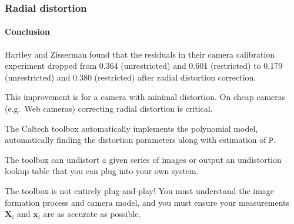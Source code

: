 \documentclass[aspectratio=169]{beamer}
\renewcommand{\vec}[1]{\boldsymbol{#1}}
\newcommand{\mat}[1]{\mathtt{#1}}
\begin{document}
\begin{frame}
\frametitle{Radial distortion}
\framesubtitle{Conclusion}

Hartley and Zisserman found that the residuals in their camera
calibration experiment dropped from 0.364 (unrestricted) and 0.601
(restricted) to 0.179 (unrestricted) and 0.380 (restricted) after
radial distortion correction.

\medskip

This improvement is for a camera with \alert{minimal} distortion.  On
cheap cameras (e.g.\ Web cameras) \alert{correcting radial distortion
  is critical}.

\medskip

The Caltech toolbox automatically implements the polynomial
model, automatically
finding the distortion parameters along with estimation of $\mat{P}$.

\medskip

The toolbox can \alert{undistort a given series} of images or
\alert{output an undistortion lookup table} that you can plug into
your own system.

\medskip

The toolbox is not entirely plug-and-play!  You must understand the
image formation process and camera model, and you must ensure your
measurements $\vec{X}_i$ and $\vec{x}_i$ are as accurate as possible.

\end{frame}
\end{document}
